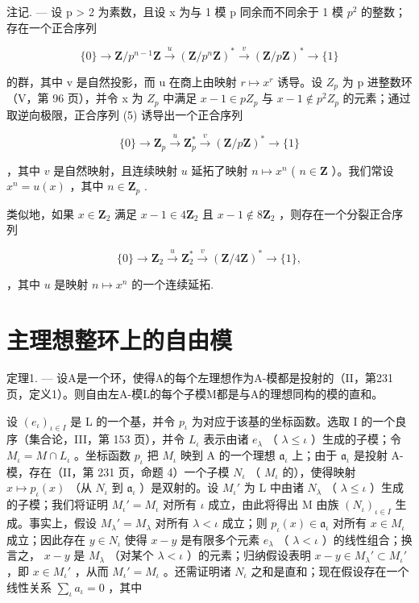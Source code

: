 注记. --- 设 p \textgreater{} 2 为素数，且设 x 为与 1 模 p 同余而不同余于 1 模 \(p^{2}\) 的整数；存在一个正合序列

\[
\{0 \} \rightarrow \mathbf {Z} / p ^ {n - 1} \mathbf {Z} \xrightarrow {u} (\mathbf {Z} / p ^ {n} \mathbf {Z}) ^ {*} \xrightarrow {v} (\mathbf {Z} / p \mathbf {Z}) ^ {*} \rightarrow \{1 \}\tag{5}
\]

的群，其中 v 是自然投影，而 u 在商上由映射 \(r \mapsto x^{r}\) 诱导。设 \(Z_{p}\) 为 p 进整数环（V，第 96 页），并令 x 为 \(Z_{p}\) 中满足 \(x - 1 \in pZ_{p}\) 与 \(x - 1 \notin p^{2}Z_{p}\) 的元素；通过取逆向极限，正合序列 (5) 诱导出一个正合序列

\[
\{0 \} \rightarrow \mathbf {Z} _ {p} \stackrel {u} {\rightarrow} \mathbf {Z} _ {p} ^ {*} \stackrel {v} {\rightarrow} (\mathbf {Z} / p \mathbf {Z}) ^ {*} \rightarrow \{1 \}
\]

，其中 \(v\) 是自然映射，且连续映射 \(u\) 延拓了映射 \(n \mapsto x^n\) ( \(n \in \mathbf{Z}\) ）。我们常设 \(x^n = u(x)\) ，其中 \(n \in \mathbf{Z}_p\) .

类似地，如果 \(x \in \mathbf{Z}_2\) 满足 \(x - 1 \in 4\mathbf{Z}_2\) 且 \(x - 1 \notin 8\mathbf{Z}_2\) ，则存在一个分裂正合序列

\[
\{0 \} \rightarrow \mathbf {Z} _ {2} \stackrel {{u}} {{\rightarrow}} \mathbf {Z} _ {2} ^ {*} \stackrel {{v}} {{\rightarrow}} (\mathbf {Z} / 4 \mathbf {Z}) ^ {*} \rightarrow \{1 \},
\]

，其中 \(u\) 是映射 \(n \mapsto x^n\) 的一个连续延拓.

\section{主理想整环上的自由模}

定理1. --- 设A是一个环，使得A的每个左理想作为A-模都是投射的（II，第231页，定义1）。则自由左A-模L的每个子模M都是与A的理想同构的模的直和。

设 \((e_{\iota})_{\iota \in I}\) 是 L 的一个基，并令 \(p_{\iota}\) 为对应于该基的坐标函数。选取 I 的一个良序（集合论，III，第 153 页），并令 \(L_{\iota}\) 表示由诸 \(e_{\lambda}\) （ \(\lambda \leqslant \iota\) ）生成的子模；令 \(M_{\iota} = M \cap L_{\iota}\) 。坐标函数 \(p_{\iota}\) 把 \(M_{\iota}\) 映到 A 的一个理想 \(\mathfrak{a}_{\iota}\) 上；由于 \(\mathfrak{a}_{\iota}\) 是投射 A-模，存在（II，第 231 页，命题 4）一个子模 \(N_{\iota}\) （ \(M_{\iota}\) 的），使得映射 \(x \mapsto p_{\iota}(x)\) （从 \(N_{\iota}\) 到 \(\mathfrak{a}_{\iota}\) ）是双射的。设 \(M_{\iota}'\) 为 L 中由诸 \(N_{\lambda}\) （ \(\lambda \leqslant \iota\) ）生成的子模；我们将证明 \(M_{\iota}' = M_{\iota}\) 对所有 \(\iota\) 成立，由此将得出 M 由族 \((N_{\iota})_{\iota \in I}\) 生成。事实上，假设 \(M_{\lambda}' = M_{\lambda}\) 对所有 \(\lambda < \iota\) 成立；则 \(p_{\iota}(x) \in \mathfrak{a}_{\iota}\) 对所有 \(x \in M_{\iota}\) 成立；因此存在 \(y \in N_{\iota}\) 使得 \(x - y\) 是有限多个元素 \(e_{\lambda}\) （ \(\lambda < \iota\) ）的线性组合；换言之， \(x - y\) 是 \(M_{\lambda}\) （对某个 \(\lambda < \iota\) ）的元素；归纳假设表明 \(x - y \in M_{\lambda}' \subset M_{\iota}'\) ，即 \(x \in M_{\iota}'\) ，从而 \(M_{\iota}' = M_{\iota}\) 。还需证明诸 \(N_{\iota}\) 之和是直和；现在假设存在一个线性关系 \(\sum_{\iota} a_{\iota} = 0\) ，其中

